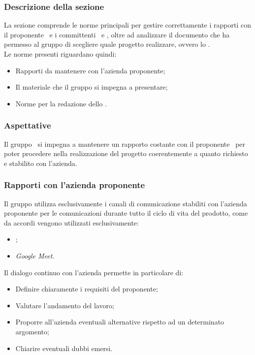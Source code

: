 \subsubsection{Descrizione della sezione} 
La sezione comprende le norme principali per gestire correttamente i rapporti con il proponente \Proponente\ e i committenti \VT\ e \CR, oltre ad analizzare il documento che ha permesso al gruppo di scegliere quale progetto realizzare, ovvero lo . \\
Le norme presenti riguardano quindi:
\begin{itemize}
	\item Rapporti da mantenere con l'azienda proponente;
	\item Il materiale che il gruppo si impegna a presentare;
	\item Norme per la redazione  dello .
\end{itemize}

\subsubsection{Aspettative}
Il gruppo \Gruppo\ si impegna a mantenere un rapporto costante con il proponente \Proponente\ per poter procedere nella realizzazione del progetto coerentemente a quanto richiesto e stabilito con l'azienda. 

\subsubsection{Rapporti con l'azienda proponente \Proponente}\label{Rapporti RedBabel}
Il gruppo utilizza esclusivamente i canali di comunicazione stabiliti con l'azienda proponente per le comunicazioni durante tutto il ciclo di vita del prodotto, come da accordi vengono utilizzati esclusivamente:
\begin{itemize}
	\item {};
	\item \textit{Google Meet}.
\end{itemize}
Il dialogo continuo con l'azienda permette in particolare di:
\begin{itemize}
	\item Definire chiaramente i requisiti del proponente;
	\item Valutare l'andamento del lavoro;
	\item Proporre all'azienda eventuali alternative rispetto ad un determinato argomento;
	\item Chiarire eventuali dubbi emersi.
\end{itemize}

